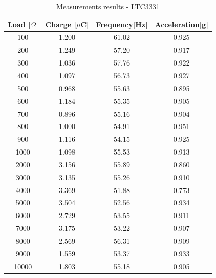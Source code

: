 \documentclass[12pt,a4paper]{article}
\begin{document}
\begin{table}[ht!]
\centering

\begin{tabular}{|c|c|c|c|}
    \hline
    \textbf{Load} [$\Omega$] & \textbf{Charge} [$\mu$C]& \textbf{Frequency}[Hz] & \textbf{Acceleration}[g] \\
    \hline
    100 & 1.200 & 61.02 & 0.925 \\
    \hline
    200 & 1.249 & 57.20 & 0.917 \\
    \hline
    300 & 1.036 & 57.76 & 0.922 \\
    \hline
    400 & 1.097 & 56.73 & 0.927 \\
    \hline
    500 & 0.968 & 55.63 & 0.895 \\
    \hline
    600 & 1.184 & 55.35 & 0.905 \\
    \hline
    700 & 0.896 & 55.16 & 0.904 \\
    \hline
    800 & 1.000 & 54.91 & 0.951 \\
    \hline
    900 & 1.116 & 54.15 & 0.925 \\
    \hline
    1000 & 1.098 & 55.53 & 0.913 \\
    \hline
    2000 & 3.156 & 55.89 & 0.860 \\
    \hline
    3000 & 3.135 & 55.26 & 0.910 \\
    \hline
    4000 & 3.369 & 51.88 & 0.773 \\
    \hline
    5000 & 3.504 & 52.56 & 0.934 \\
    \hline
    6000 & 2.729 & 53.55 & 0.911 \\
    \hline
    7000 & 3.175 & 53.22 & 0.907 \\
    \hline
    8000 & 2.569 & 56.31 & 0.909 \\
    \hline
    9000 & 1.559 & 53.37 & 0.933 \\
    \hline
    10000 & 1.803 & 55.18 & 0.905 \\
    \hline
\end{tabular}
\caption{Measurements results - LTC3331}
\label{tab:ltc3331results}
\end{table}
\end{document}
